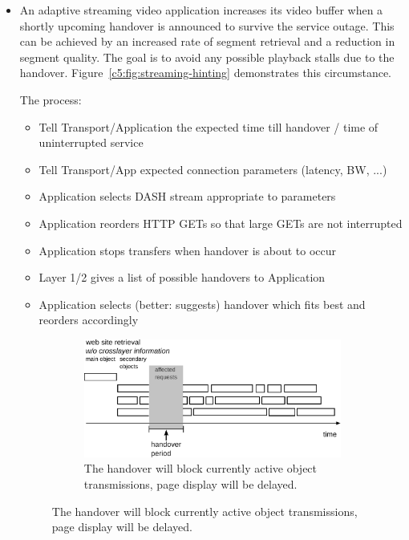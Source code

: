 \begin{itemize}
	\item An adaptive streaming video application increases its video buffer when a shortly upcoming handover is announced to survive the service outage. This can be achieved by an increased rate of segment retrieval and a reduction in segment quality. The goal is to avoid any possible playback stalls due to the handover. Figure~\ref{c5:fig:streaming-hinting} demonstrates this circumstance.

	The process:
		\begin{itemize}
		\item Tell Transport/Application the expected time till handover / time of uninterrupted service
		\item Tell Transport/App expected connection parameters (latency, BW, ...)
		\item Application selects \gls{DASH} stream appropriate to parameters
		\item Application reorders \gls{HTTP} GETs so that large GETs are not interrupted
		\item Application stops transfers when handover is about to occur
		\item Layer 1/2 gives a list of possible handovers to Application
		\item Application selects (better: suggests) handover which fits best and reorders accordingly
	\end{itemize}

	\begin{figure}[htb]
	        \centering
	        \begin{subfigure}[b]{0.90\textwidth}
	            \centering
				\includegraphics[width=\textwidth]{images/http-reorder-no-cl.pdf}
				\caption{The handover will block currently active object transmissions, page display will be delayed.}
				\label{c5:fig:http-reorder-no-cl}
	        \end{subfigure}%


\end{figure}
\end{itemize}

